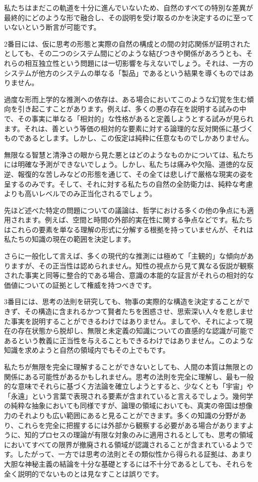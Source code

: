 \documentclass[a4paper,11pt,openany]{ltjsbook}
\begin{document}
私たちはまだこの軌道を十分に進んでいないため、自然のすべての特別な差異が最終的にどのような形で融合し、その説明を受け取るのかを決定するのに至っていないという断言が可能です。

2番目には、仮に思考の形態と実際の自然の構成との間の対応関係が証明されたとしても、その二つのシステム間にどのような結びつきや関係があろうとも、それらの相互独立性という問題には一切影響を与えないでしょう。それは、一方のシステムが他方のシステムの単なる「製品」であるという結果を導くものではありません。

過度な形而上学的な推測への依存は、ある場合においてこのような幻覚を生む傾向を引き起こすことがあります。例えば、多くの悪の存在を説明する試みの中で、その事実に単なる「相対的」な性格があると定義しようとする試みが見られます。それは、善という等価の相対的な要素に対する論理的な反対関係に基づくものであるとします。しかし、この仮定は純粋に任意なものでしかありません。

無限なる智慧と清浄さの眼から見た悪とはどのようなものかについては、私たちには明確な予測ができないでしょう。しかし、私たちは痛みや欠陥、道徳的な反逆、報復的な苦しみなどの形態を通じて、その全ては悲しげで厳格な現実の姿を呈するのみです。そして、それに対する私たちの自然の全防衛力は、純粋な考慮よりも高いレベルでのみ正当化されるでしょう。

先ほど述べた特定の問題についての議論は、哲学における多くの他の争点にも適用されます。例えば、空間と時間の外部的実在性に関する争点などです。私たちはこれらの要素を単なる理解の形式に分解する根拠を持っていませんが、それは私たちの知識の現在の範囲を決定します。

さらに一般化して言えば、多くの現代的な推測には極めて「主観的」な傾向がありますが、その正当性は認められません。知性の視点から見て異なる仮説が観察された事実と同等に整合的である場合、意識の本能的な証言がそれらの相対的な価値についての証拠として権威を持つべきです。

3番目には、思考の法則を研究しても、物事の実際的な構造を決定することができず、その構造に含まれるかつて賢者たちを困惑させ、思索深い人々を悲しませた事実を説明することができるわけではありません。ましてや、それによって現在の存在状態から脱却し、無限と未定義の知識についての直感的な認識が可能であるという教義に正当性を与えることもできるわけではありません。このような知識を求めようと自然の領域内でもその上でもです。

私たちが無限を完全に理解することができないとしても、人間の本質は無限との関係にある可能性があるかもしれません。思考の法則を完全に理解し、最も一般的な意味でそれらに基づく方法論を確立しようとすると、少なくとも「宇宙」や「永遠」という言葉で表現される要素が含まれていると言えるでしょう。幾何学の純粋な抽象においても同様ですが、論理の領域においても、真実の帝国は想像力のそれよりも広い範囲にあると見ることができます。多くの知識の分野があり、これらを完全に把握するには外部から観察する必要がある場合がありますように、知的プロセスの理論が有限な対象のみに適用されるとしても、思考の領域においてすべての限界が撤廃される領域が認識されることが含まれているようです。したがって、一方では思考の法則とその類似性から得られる証拠は、あまり大胆な神秘主義の結論を十分な基礎とするには不十分であるとしても、それらを全く説明的でないものとは見なすことは誤りです。
\end{document}
